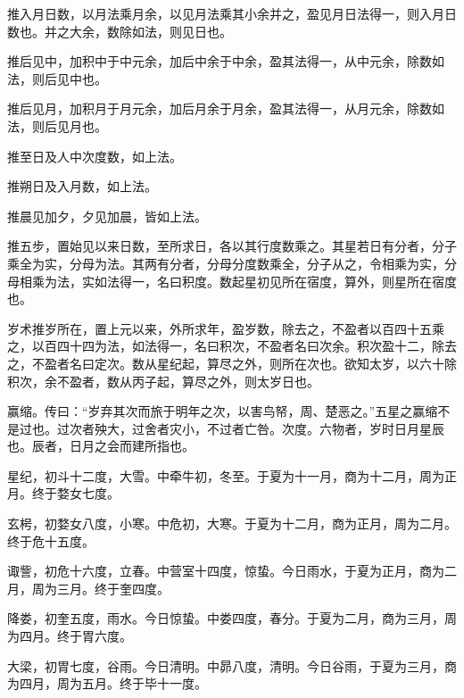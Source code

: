 \documentclass[12pt,UTF8]{ctexbook}
\begin{document}
推入月日数，以月法乘月余，以见月法乘其小余并之，盈见月日法得一，则入月日数也。并之大余，数除如法，则见日也。



推后见中，加积中于中元余，加后中余于中余，盈其法得一，从中元余，除数如法，则后见中也。



推后见月，加积月于月元余，加后月余于月余，盈其法得一，从月元余，除数如法，则后见月也。



推至日及人中次度数，如上法。



推朔日及入月数，如上法。



推晨见加夕，夕见加晨，皆如上法。



推五步，置始见以来日数，至所求日，各以其行度数乘之。其星若日有分者，分子乘全为实，分母为法。其两有分者，分母分度数乘全，分子从之，令相乘为实，分母相乘为法，实如法得一，名曰积度。数起星初见所在宿度，算外，则星所在宿度也。



岁术推岁所在，置上元以来，外所求年，盈岁数，除去之，不盈者以百四十五乘之，以百四十四为法，如法得一，名曰积次，不盈者名曰次余。积次盈十二，除去之，不盈者名曰定次。数从星纪起，算尽之外，则所在次也。欲知太岁，以六十除积次，余不盈者，数从丙子起，算尽之外，则太岁日也。



赢缩。传曰：“岁弃其次而旅于明年之次，以害鸟帑，周、楚恶之。”五星之赢缩不是过也。过次者殃大，过舍者灾小，不过者亡咎。次度。六物者，岁时日月星辰也。辰者，日月之会而建所指也。



星纪，初斗十二度，大雪。中牵牛初，冬至。于夏为十一月，商为十二月，周为正月。终于婺女七度。



玄枵，初婺女八度，小寒。中危初，大寒。于夏为十二月，商为正月，周为二月。终于危十五度。



诹訾，初危十六度，立春。中营室十四度，惊蛰。今日雨水，于夏为正月，商为二月，周为三月。终于奎四度。



降娄，初奎五度，雨水。今日惊蛰。中娄四度，春分。于夏为二月，商为三月，周为四月。终于胃六度。



大梁，初胃七度，谷雨。今日清明。中昴八度，清明。今日谷雨，于夏为三月，商为四月，周为五月。终于毕十一度。
\end{document}
